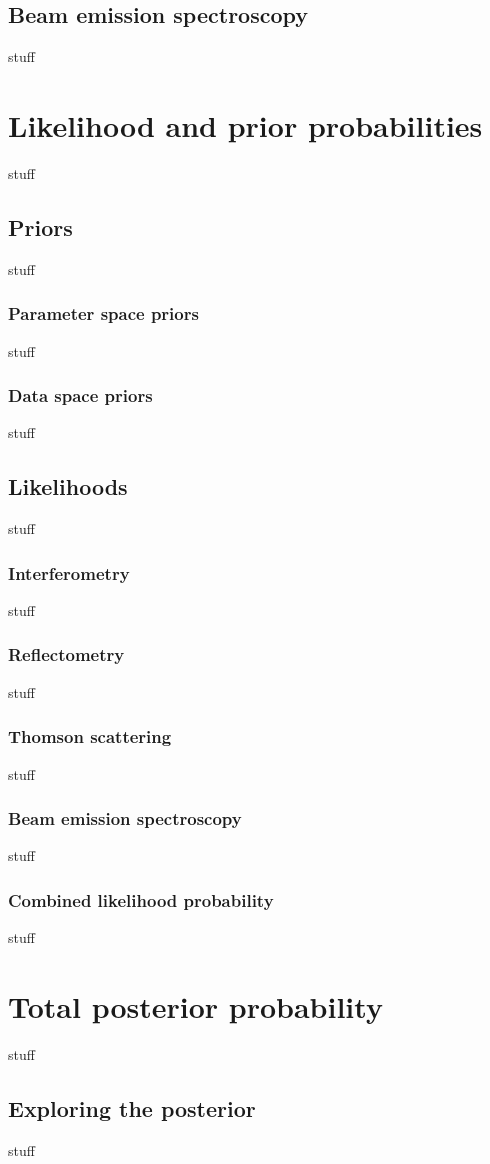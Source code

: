 \documentclass	[12pt]{article}
\begin{document}
\subsection{Beam emission spectroscopy}
stuff
\section{Likelihood and prior probabilities}
stuff
\subsection{Priors}
stuff
\subsubsection{Parameter space priors}
stuff
\subsubsection{Data space priors}
stuff
\subsection{Likelihoods}
stuff
\subsubsection{Interferometry}
stuff
\subsubsection{Reflectometry}
stuff
\subsubsection{Thomson scattering}
stuff
\subsubsection{Beam emission spectroscopy}
stuff
\subsubsection{Combined likelihood probability}
stuff
\section{Total posterior probability}
stuff
\subsection{Exploring the posterior}
stuff
\end{document}
